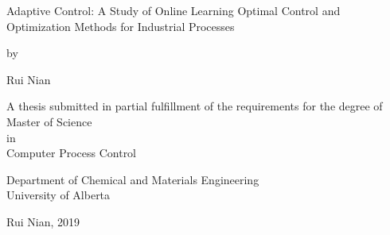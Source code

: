 \documentclass[12pt]{report}
\begin{document}
\begin{titlepage}
    \begin{center}
    
        \vspace*{1.1cm}
        
        \LARGE
        Adaptive Control: A Study of Online Learning Optimal Control and Optimization Methods for Industrial Processes \\
        
        \vspace{1cm}
        
        \normalsize by \\
        
        \vspace{1cm}
        
        \large Rui Nian \\
        
        \vspace{3cm}
        
        {\normalsize
        A thesis submitted in partial fulfillment of the requirements for the degree of \\
        \vspace{1cm}}
        Master of Science \\
        {\normalsize in} \\ 
        Computer Process Control \\
        
        \vspace{3cm}
        
        {\normalsize
        Department of Chemical and Materials Engineering \\
        University of Alberta \\}
        
        \vspace{1cm}
        
        {\normalsize
        \textcopyright \hspace{1mm} Rui Nian, 2019 \\}
        

    \end{center}
\end{titlepage}



\setcounter{page}{2}
\end{document}
